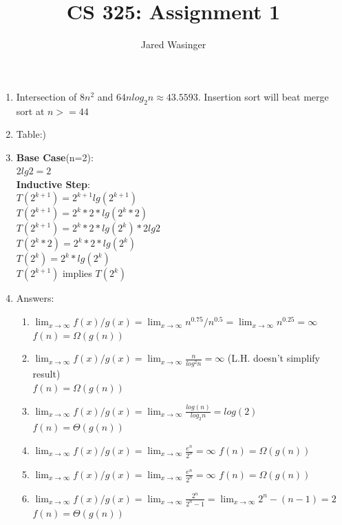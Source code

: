 \documentclass{article}
\begin{document}
\title{CS 325: Assignment 1}
\author{Jared Wasinger}

\maketitle

 \begin{enumerate}
   \item Intersection of $8n^2$ and $64nlog_2n \approx 43.5593$.  Insertion sort will beat merge sort at $n >= 44$
   \item Table:)
   \item \textbf{Base Case}(n=2):\\
   $2lg2 = 2$\\
   \textbf{Inductive Step}:\\
   $T(2^{k+1}) = 2^{k+1}lg(2^{k+1})$\\
   $T(2^{k+1}) = 2^k*2*lg(2^k*2)$\\
   $T(2^{k+1}) = 2^k*2*lg(2^k)*2lg2$\\
   $T(2^k*2) = 2^k*2*lg(2^k)$\\
   $T(2^k) = 2^k*lg(2^k)$\\
   $T(2^{k+1})$ implies $T(2^k)$\\

   \item Answers:
   \begin{enumerate}
     \item $\lim_{x\to\infty} f(x)/g(x) = \lim_{x\to\infty} n^{0.75}/n^{0.5} = \lim_{x\to\infty} n^{0.25} = \infty$\\
     $f(n) = \Omega(g(n))$

     \item $\lim_{x\to\infty} f(x)/g(x) = \lim_{x\to\infty} \frac{n} {log^2n} = \infty$ (L.H. doesn't simplify result)\\
     $f(n) = \Omega(g(n))$

     \item $\lim_{x\to\infty} f(x)/g(x) = \lim_{x\to\infty} \frac {log(n)} {log_2n} = log(2)$
     $f(n) = \Theta(g(n))$

     \item $\lim_{x\to\infty} f(x)/g(x) = \lim_{x\to\infty} \frac {e^n} {2^n} = \infty$
     $f(n) = \Omega(g(n))$

     \item $\lim_{x\to\infty} f(x)/g(x) = \lim_{x\to\infty} \frac {e^n} {2^n} = \infty$
     $f(n) = \Omega(g(n))$

     \item $\lim_{x\to\infty} f(x)/g(x) = \lim_{x\to\infty} \frac {2^n} {2^n-1} = \lim_{x\to\infty} 2^n-(n-1)=2$
     $f(n) = \Theta(g(n))$


\end{enumerate}
\end{enumerate}
\end{document}
